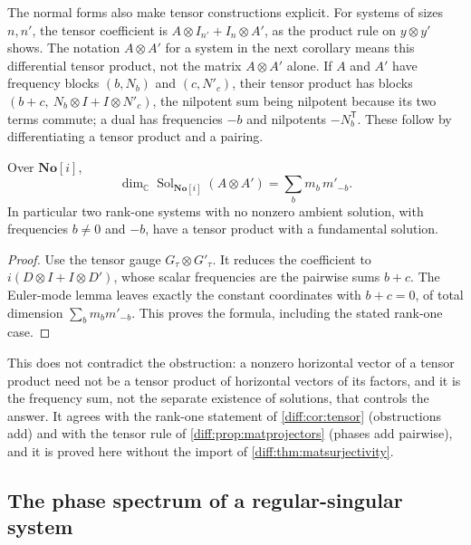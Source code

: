 \documentclass[11pt,letterpaper]{article}
\numberwithin{equation}{section}
\theoremstyle{definition}
\theoremstyle{remark}
\newcommand{\SC}{\mathbf{No}[i]}
\newcommand{\C}{\mathbb C}
\newcommand{\Sol}{\operatorname{Sol}}
\begin{document}
The normal forms also make tensor constructions explicit.
For systems of sizes $n,n'$, the tensor coefficient is
$A\otimes I_{n'}+I_n\otimes A'$, as the product rule on $y\otimes y'$
shows. The notation $A\otimes A'$ for a system in the next corollary
means this differential tensor product, not the matrix $A\otimes A'$
alone. If $A$ and $A'$ have
frequency blocks $(b,N_{b})$ and $(c,N'_{c})$, their tensor product has blocks
$(b+c,\ N_{b}\otimes I+I\otimes N'_{c})$, the nilpotent sum being nilpotent
because its two terms commute; a dual has frequencies $-b$ and nilpotents
$-N_{b}^{\mathsf T}$. These follow by differentiating a tensor product and a
pairing.

\begin{corollary}
\label{diff:rs:cor:tensor}
Over $\SC$,
\[
 \dim_{\C}\Sol_{\SC}(A\otimes A')=\sum_{b}m_{b}\,m'_{-b}.
\]
In particular two rank-one systems with no nonzero ambient solution, with
frequencies $b\neq0$ and $-b$, have a tensor product with a fundamental
solution.
\end{corollary}
\begin{proof}
Use the tensor gauge $G_{\tau}\otimes G'_{\tau}$. It reduces the
coefficient to $i(D\otimes I+I\otimes D')$, whose scalar frequencies
are the pairwise sums $b+c$. The Euler-mode lemma leaves exactly the
constant coordinates with $b+c=0$, of total dimension
$\sum_bm_bm'_{-b}$. This proves the formula, including the stated
rank-one case.
\end{proof}

This does not contradict the obstruction: a nonzero horizontal vector of a
tensor product need not be a tensor product of horizontal vectors of its
factors, and it is the frequency sum, not the separate existence of
solutions, that controls the answer. It agrees with the rank-one statement of
\cref{diff:cor:tensor} (obstructions add) and with the tensor rule of
\cref{diff:prop:matprojectors} (phases add pairwise), and it is proved here
without the import of \cref{diff:thm:matsurjectivity}.

\subsection{The phase spectrum of a regular-singular system}
\label{diff:rs:sub:phasespectrum}
\end{document}

